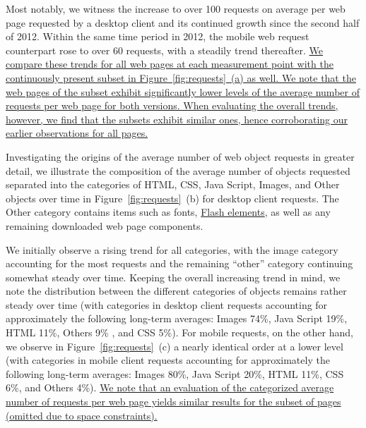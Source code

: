 \documentclass[onecolumn,12pt]{IEEEtran}
\begin{document}
Most notably, we witness the increase to over 100 requests on average per web page requested by a desktop client and its continued growth since the second half of 2012.
Within the same time period in 2012, the mobile web request counterpart rose to over 60 requests, with a steadily trend thereafter. 
\uline{We compare these trends for all web pages at each measurement point with the continuously present subset in Figure~\ref{fig:requests}~(a) as well.
We note that the web pages of the subset exhibit significantly lower levels of the average number of requests per web page for both versions. 
When evaluating the overall trends, however, we find that the subsets exhibit similar ones, hence corroborating our earlier observations for all pages.}

Investigating the origins of the average number of web object requests in greater detail, we illustrate the composition of the average number of objects requested separated into the categories of HTML, CSS, Java Script, Images, and Other objects over time in Figure~\ref{fig:requests}~(b) for desktop client requests.
The Other category contains items such as fonts, \uline{Flash elements}, as well as any remaining downloaded web page components.

We initially observe a rising trend for all categories, with the image category accounting for the most requests and the remaining ``other'' category continuing somewhat steady over time.
Keeping the overall increasing trend in mind, we note the distribution between the different categories of objects remains rather steady over time (with categories in desktop client requests accounting for approximately the following long-term averages: Images 74\%, Java Script 19\%, HTML 11\%, Others 9\% , and CSS 5\%).
For mobile requests, on the other hand, we observe in Figure~\ref{fig:requests}~(c) a nearly identical order at a lower level (with categories in mobile client requests accounting for approximately the following long-term averages: Images 80\%, Java Script 20\%, HTML 11\%, CSS 6\%, and Others 4\%).
\uline{We note that an evaluation of the categorized average number of requests per web page yields similar results for the subset of pages (omitted due to space constraints).}
\end{document}
